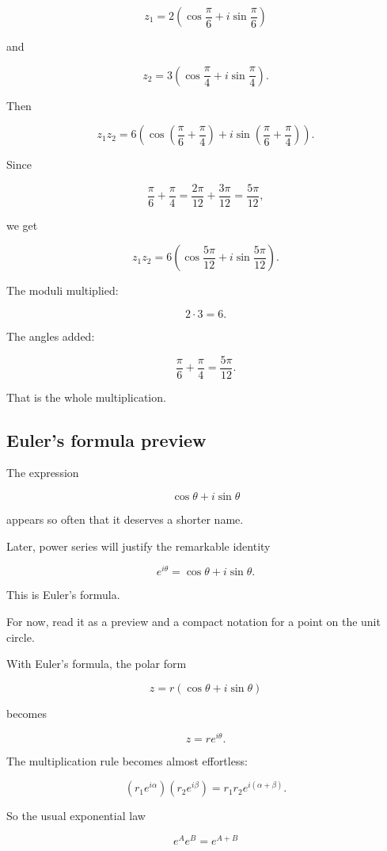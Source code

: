 \[
z_1=2\left(\cos\frac{\pi}{6}+i\sin\frac{\pi}{6}\right)
\]

and

\[
z_2=3\left(\cos\frac{\pi}{4}+i\sin\frac{\pi}{4}\right).
\]

Then

\[
z_1z_2
=
6\left(\cos\left(\frac{\pi}{6}+\frac{\pi}{4}\right)
+i\sin\left(\frac{\pi}{6}+\frac{\pi}{4}\right)\right).
\]

Since

\[
\frac{\pi}{6}+\frac{\pi}{4}
=
\frac{2\pi}{12}+\frac{3\pi}{12}
=
\frac{5\pi}{12},
\]

we get

\[
\boxed{
z_1z_2
=
6\left(\cos\frac{5\pi}{12}+i\sin\frac{5\pi}{12}\right).
}
\]

The moduli multiplied:

\[
2\cdot3=6.
\]

The angles added:

\[
\frac{\pi}{6}+\frac{\pi}{4}=\frac{5\pi}{12}.
\]

That is the whole multiplication.

\subsection{Euler's formula preview}
\label{subsec:euler-formula-preview}

The expression

\[
\cos\theta+i\sin\theta
\]

appears so often that it deserves a shorter name.

Later, power series will justify the remarkable identity

\[
\boxed{
e^{i\theta}=\cos\theta+i\sin\theta.
}
\]

This is Euler's formula.

For now, read it as a preview and a compact notation for a point on the unit circle.

With Euler's formula, the polar form

\[
z=r(\cos\theta+i\sin\theta)
\]

becomes

\[
\boxed{
z=re^{i\theta}.
}
\]

The multiplication rule becomes almost effortless:

\[
(r_1e^{i\alpha})(r_2e^{i\beta})
=
r_1r_2e^{i(\alpha+\beta)}.
\]

So the usual exponential law

\[
e^Ae^B=e^{A+B}
\]


